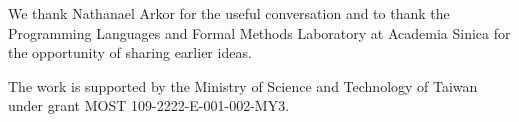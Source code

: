 \documentclass[acmsmall,screen]{acmart}
\theoremstyle{acmdefinition}
\begin{document}


\maketitle










\begin{acks}
We thank Nathanael Arkor for the useful conversation and to thank the Programming Languages and Formal Methods Laboratory at Academia Sinica for the opportunity of sharing earlier ideas.

The work is supported by the Ministry of Science and Technology of Taiwan under grant MOST 109-2222-E-001-002-MY3.
\end{acks}



\end{document}
